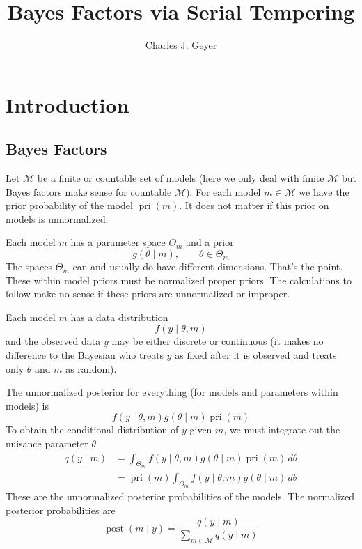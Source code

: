 \documentclass[11pt]{article}
\DeclareMathOperator{\prior}{pri}
\DeclareMathOperator{\posterior}{post}
\begin{document}
\title{Bayes Factors via Serial Tempering}
\author{Charles J. Geyer}
\maketitle


\section{Introduction}

\subsection{Bayes Factors} \label{sec:bayes-factors}

Let $\mathcal{M}$ be a finite or countable set of models (here we only
deal with finite $\mathcal{M}$ but Bayes factors make sense for countable
$\mathcal{M}$).  For each model
$m \in \mathcal{M}$ we have the prior probability of the model $\prior(m)$.
It does not matter if this prior on models is unnormalized.

Each model $m$ has a parameter space $\Theta_m$ and a prior
$$
   g(\theta \mid m), \qquad \theta \in \Theta_m
$$
The spaces $\Theta_m$ can and usually do have different dimensions.  That's
the point.  These within model priors must be normalized proper priors.
The calculations to follow make no sense if these priors are unnormalized
or improper.

Each model $m$ has a data distribution
$$
   f(y \mid \theta, m)
$$
and the observed data $y$ may be either discrete or continuous
(it makes no difference to
the Bayesian who treats $y$ as fixed after it is observed and treats
only $\theta$ and $m$ as random).

The unnormalized posterior for everything
(for models and parameters within models)
is
$$
   f(y \mid \theta, m) g(\theta \mid m) \prior(m)
$$
To obtain the conditional distribution of $y$ given $m$, we must integrate
out the nuisance parameter $\theta$
\begin{align*}
   q(y \mid m)
   & =
   \int_{\Theta_m} f(y \mid \theta, m) g(\theta \mid m) \prior(m) \, d \theta
   \\
   & =
   \prior(m) \int_{\Theta_m} f(y \mid \theta, m) g(\theta \mid m) \, d \theta
\end{align*}
These are the unnormalized posterior probabilities of the models.  The
normalized posterior probabilities are
$$
   \posterior(m \mid y)
   =
   \frac{ q(y \mid m) }{ \sum_{m \in \mathcal{M}} q(y \mid m) }
$$
\end{document}
